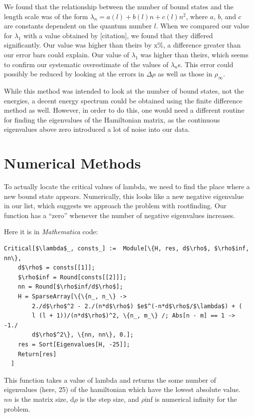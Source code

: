 \documentclass[12pt,twoside]{reedthesis}
\begin{document}
We found that the relationship between the number of bound states and the length scale was of the form $\lambda_n = a(l) + b(l)n + c(l)n^2$, where $a$, $b$, and $c$ are constants dependent on the quantum number $l$. When we compared our value for $\lambda_1$ with a value obtained by [citation], we found that they differed significantly. Our value was higher than theirs by x\%, a difference greater than our error bars could explain. Our value of $\lambda_1$ was higher than theirs, which seems to confirm our systematic overestimate of the values of $\lambda_n$s. This error could possibly be reduced by looking at the errors in $\Delta \rho$ as well as those in $\rho_{\infty}$. 

While this method was intended to look at the number of bound states, not the energies, a decent energy spectrum could be obtained using the finite difference method as well. However, in order to do this, one would need a different routine for finding the eigenvalues of the Hamiltonian matrix, as the continuous eigenvalues above zero introduced a lot of noise into our data. 
%
\appendix
\chapter{Numerical Methods}
To actually locate the critical values of lambda, we need to find the place where a new bound state appears. Numerically, this looks like a new negative eigenvalue in our list, which suggests we approach the problem with rootfinding. Our function has a ``zero'' whenever the number of negative eigenvalues increases.

Here it is in \emph{Mathematica} code:
\begin{Verbatim}[commandchars=\\\{\}, codes={\catcode`$=3}]
Critical[$\lambda$_, consts_] :=  Module[\{H, res, d$\rho$, $\rho$inf, nn\},
    d$\rho$ = consts[[1]];
    $\rho$inf = Round[consts[[2]]];
    nn = Round[$\rho$inf/d$\rho$];
    H = SparseArray[\{\{n_, n_\} -> 
        2./d$\rho$^2 - 2./(n*d$\rho$) $e$^(-n*d$\rho$/$\lambda$) + (
        l (l + 1))/(n*d$\rho$)^2, \{n_, m_\} /; Abs[n - m] == 1 -> -1./
        d$\rho$^2\}, \{nn, nn\}, 0.];
    res = Sort[Eigenvalues[H, -25]];
    Return[res]
  ]
\end{Verbatim}
This function takes a value of lambda and returns the some number of eigenvalues (here, 25)  of the hamiltonian which have the lowest absolute value. $nn$ is the matrix size, d$\rho$ is the step size, and $\rho$inf is numerical infinity for the problem.
\end{document}
